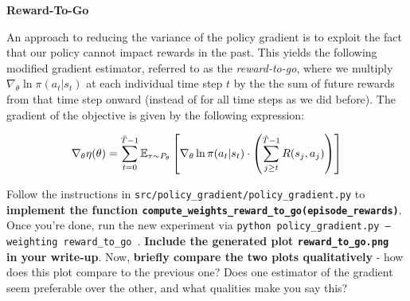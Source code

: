 \item {} 
\textbf{Reward-To-Go}

An approach to reducing the variance of the policy gradient is to exploit the fact that our policy cannot impact rewards in the past. This yields the following modified gradient estimator, referred to as the \textit{reward-to-go}, where we multiply $\nabla_\theta \ln \pi(a_t | s_t)$ at each individual time step $t$ by the the sum of future rewards from that time step onward (instead of for all time steps as we did before). The gradient of the objective is given by the following expression:

\begin{align*}
    \nabla_\theta \eta(\theta) = \sum_{t=0}^{\tilde{T}-1} \mathbb{E}_{\tau \sim P_\theta} \left[ \nabla_\theta \ln \pi(a_t | s_t) \cdot \left( \sum_{j \geq t}^{\tilde{T} - 1} R(s_j, a_j) \right) \right]
\end{align*}


Follow the instructions in \texttt{src/policy\_gradient/policy\_gradient.py} to \textbf{implement the function \texttt{compute\_weights\_reward\_to\_go(episode\_rewards)}}. Once you're done, run the new experiment via {\tt python policy\_gradient.py --weighting reward\_to\_go }. \textbf{Include the generated plot {\tt reward\_to\_go.png } in your write-up}. Now, \textbf{briefly compare the two plots qualitatively} - how does this plot compare to the previous one? Does one estimator of the gradient seem preferable over the other, and what qualities make you say this?

